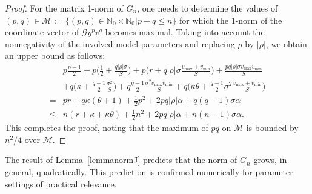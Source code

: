 \begin{lemma}
\begin{proof}
For the matrix 1-norm of $G_n$, one needs to determine the values of $(p,q) \in \mathcal{M}:= \{(p,q) \in \mathbb{N}_0 \times \mathbb{N}_0 | p+q \leq n\}$ for which the $1$-norm of the coordinate vector of $\mathcal{G} y^p v^q$ becomes maximal. Taking into account the nonnegativity of the involved model parameters and replacing $\rho$ by $|\rho|$, we obtain an upper bound as follows:
\begin{align*}
& p \frac{p-1}{2} + p \Big(\frac{1}{2}+\frac{q|\rho|\sigma}{S}\Big)+ p \Big(r+q |\rho|\sigma \frac{v_{\max} + v_{\min}}{S}\Big)+ \frac{pq |\rho|\sigma v_{\max} v_{\min}}{S}\\
&+ q \Big(\kappa + \frac{q-1}{2} \frac{\sigma^2}{S} \Big) + q \frac{q-1}{2} \frac{\sigma^2 v_{\max}v_{\min}}{S} + q \Big(\kappa \theta + \frac{q-1}{2} \sigma^2 \frac{ v_{\max} + v_{\min}}{S} \Big) \\
=& pr + q\kappa(\theta+1) + \frac12 p^2 + 2pq|\rho| \alpha +  q (q-1) \sigma \alpha  \\
\le & n( r + \kappa + \kappa\theta ) + \frac12 n^2 + 2pq|\rho| \alpha + n(n-1)\sigma \alpha. 
\end{align*}
This completes the proof, noting that the maximum of $pq$ on $\mathcal{M}$ is bounded by $n^2 / 4$
over $\mathcal{M}$.
\end{proof}
\end{lemma}

The result of Lemma~\ref{lemmanormJ} predicts that the norm of $G_n$ grows, in general, quadratically. This prediction is confirmed numerically for parameter settings of practical relevance.
